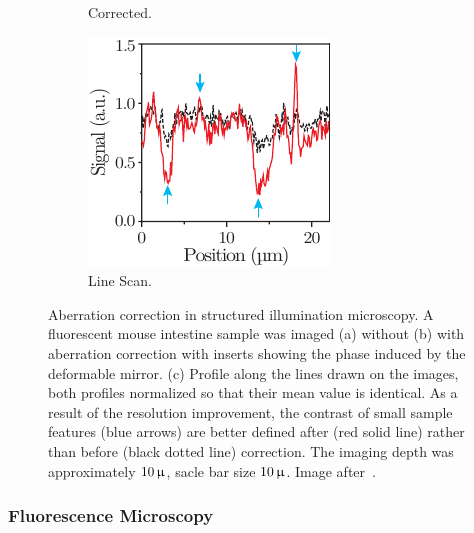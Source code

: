 \begin{figure}[tbh]
\begin{subfigure}[b]{0.3\textwidth}
                \caption{Corrected.}
                \label{fig:SI_corrected}
        \end{subfigure}
        \begin{subfigure}[b]{0.3\textwidth}
                \includegraphics[width=\textwidth]{images/structured_illumination_scan}
                \caption{Line Scan.}
                \label{fig:SI_scan}
        \end{subfigure}
								
        \caption{Aberration correction in structured illumination microscopy. A fluorescent mouse intestine sample was imaged (a) without (b) with aberration correction with inserts showing the phase induced by the deformable mirror. (c) Profile along the lines drawn on the images, both profiles normalized so that their mean value is identical. As a result of the resolution improvement, the contrast of small sample features (blue arrows) are better defined after (red solid line) rather than before (black dotted line) correction. The imaging depth was approximately $\unit[10]{\upmu}$, sacle bar size $\unit[10]{\upmu}$. Image after~\cite{wide_AOM_structured_illu}.}
\label{fig:structured_light_correction}
\end{figure} 

\subsubsection{Fluorescence Microscopy}
\label{sec:FlourescnecMicroscopy}

